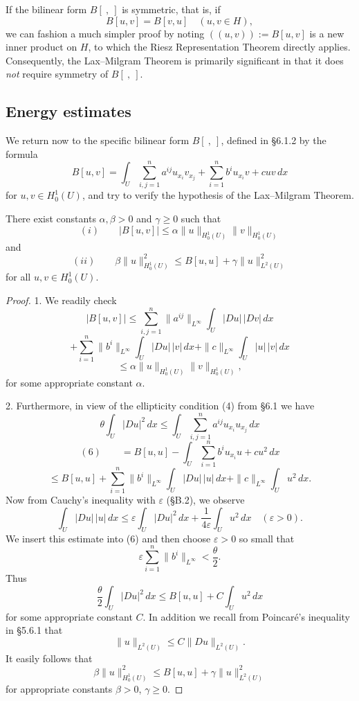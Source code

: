 \begin{remark}
\label{rem:lax-milgram-symmetric-case}
If the bilinear form $B[\ ,\ ]$ is symmetric, that is, if
$$B[u,v] = B[v,u] \quad (u,v \in H),$$
we can fashion a much simpler proof by noting $((u,v)) := B[u,v]$ is a new inner product on $H$, to which the Riesz Representation Theorem directly applies. Consequently, the Lax--Milgram Theorem is primarily significant in that it does \textit{not} require symmetry of $B[\ ,\ ]$.
\end{remark}

\subsection{Energy estimates}

We return now to the specific bilinear form $B[\ ,\ ]$, defined in \S6.1.2 by the formula
$$B[u,v] = \int_U \sum_{i,j=1}^n a^{ij}u_{x_i}v_{x_j} + \sum_{i=1}^n b^iu_{x_i}v + cuv \, dx$$
for $u,v \in H_0^1(U)$, and try to verify the hypothesis of the Lax--Milgram Theorem.

\begin{theorem}
\label{thm:energy-estimates}
There exist constants $\alpha,\beta > 0$ and $\gamma \geq 0$ such that
$$(i) \qquad |B[u,v]| \leq \alpha\|u\|_{H_0^1(U)}\|v\|_{H_0^1(U)}$$
and
$$(ii) \qquad \beta\|u\|_{H_0^1(U)}^2 \leq B[u,u] + \gamma\|u\|_{L^2(U)}^2$$
for all $u,v \in H_0^1(U)$.
\end{theorem}

\begin{proof}
1. We readily check
$$|B[u,v]| \leq \sum_{i,j=1}^n \|a^{ij}\|_{L^\infty}\int_U|Du|\,|Dv|\,dx$$
$$+ \sum_{i=1}^n \|b^i\|_{L^\infty}\int_U|Du|\,|v|\,dx + \|c\|_{L^\infty}\int_U|u|\,|v|\,dx$$
$$\leq \alpha\|u\|_{H_0^1(U)}\|v\|_{H_0^1(U)},$$
for some appropriate constant $\alpha$.

2. Furthermore, in view of the ellipticity condition (4) from \S6.1 we have
$$\theta\int_U|Du|^2\,dx \leq \int_U \sum_{i,j=1}^n a^{ij}u_{x_i}u_{x_j}\,dx$$
$$(6) \qquad = B[u,u] - \int_U \sum_{i=1}^n b^iu_{x_i}u + cu^2\,dx$$
$$\leq B[u,u] + \sum_{i=1}^n\|b^i\|_{L^\infty}\int_U|Du|\,|u|\,dx + \|c\|_{L^\infty}\int_U u^2\,dx.$$
Now from Cauchy's inequality with $\varepsilon$ (\S B.2), we observe
$$\int_U |Du|\,|u|\,dx \leq \varepsilon\int_U|Du|^2\,dx + \frac1{4\varepsilon}\int_U u^2\,dx \quad (\varepsilon > 0).$$
We insert this estimate into (6) and then choose $\varepsilon > 0$ so small that
$$\varepsilon\sum_{i=1}^n\|b^i\|_{L^\infty} < \frac\theta2.$$
Thus
$$\frac\theta2\int_U|Du|^2\,dx \leq B[u,u] + C\int_U u^2\,dx$$
for some appropriate constant $C$. In addition we recall from Poincar\'e's inequality in \S5.6.1 that
$$\|u\|_{L^2(U)} \leq C\|Du\|_{L^2(U)}.$$
It easily follows that
$$\beta\|u\|_{H_0^1(U)}^2 \leq B[u,u] + \gamma\|u\|_{L^2(U)}^2$$
for appropriate constants $\beta > 0$, $\gamma \geq 0$.
\end{proof}

